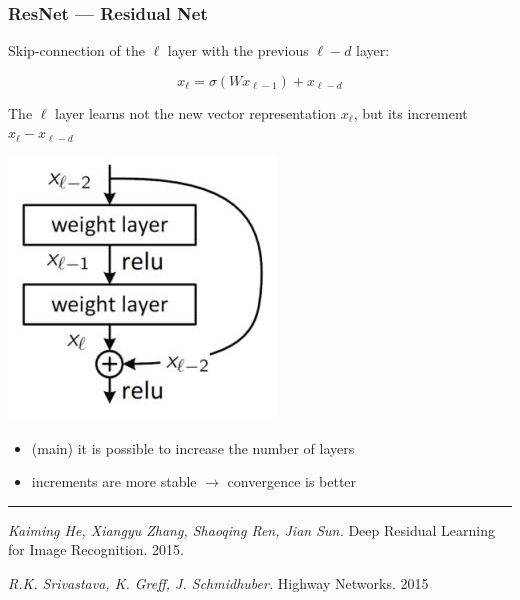 \documentclass[fullscreen=true, bookmarks=true, hyperref={pdfencoding=unicode}]{beamer}
\begin{document}
\begin{frame}
\frametitle{ResNet — Residual Net}

   Skip-connection of the $\ell$ layer with the previous $\ell - d$ layer:

   $$ x_\ell = \sigma(Wx_{\ell-1}) + x_{\ell-d}$$

   The $\ell$ layer learns not the new vector representation $x_\ell$, but its increment $x_\ell - x_{\ell-d}$

   \begin{center}
     \includegraphics[keepaspectratio,
                      width=.3\paperwidth]{skip-connection.jpg}
   \end{center}
\end{frame}


\begin{frame}
  \begin{itemize}
     \item (main) it is possible to increase the number of layers
     \item increments are more stable $\to$ convergence is better
   \end{itemize}

  \vspace{1cm}
  \noindent\rule{8cm}{0.4pt}

  {\it Kaiming He, Xiangyu Zhang, Shaoqing Ren, Jian Sun.} Deep Residual Learning for Image Recognition. 2015.

  {\it R.K. Srivastava, K. Greff, J. Schmidhuber.} Highway Networks. 2015
\end{frame}
\end{document}

